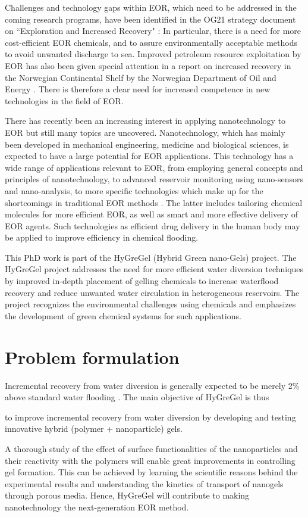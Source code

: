 Challenges and technology gaps within EOR,  which need to be addressed in the coming research programs, have been identified in the OG21 strategy document on ``Exploration and Increased Recovery" \citep{OG21}: In particular, there is a need for more cost-efficient EOR chemicals, and to assure environmentally acceptable methods to avoid unwanted discharge to sea. Improved petroleum resource exploitation by EOR has also been given special attention in a report on increased recovery in the Norwegian Continental Shelf by the Norwegian Department of Oil and Energy \citep{Am2010}. There is therefore a clear need for increased competence in new technologies in the field of EOR. 

There has recently been an increasing interest in applying nanotechnology to EOR but still many topics are uncovered. Nanotechnology,  which has mainly been developed in mechanical engineering, medicine and biological sciences, is expected to have a large potential for EOR applications. This technology has a wide range of applications relevant to EOR, from employing general concepts and principles of nanotechnology, to advanced reservoir monitoring using nano-sensors and nano-analysis, to more specific technologies which make up for the shortcomings in traditional EOR methods \citep{Fletcher2010, Ayatollahi2012, Cocuzza2011}. The latter includes tailoring chemical molecules for more efficient EOR, as well as smart and more effective delivery of EOR agents. Such technologies as efficient drug delivery in the human body may be applied to improve efficiency in chemical flooding.

This PhD work is part of the HyGreGel (Hybrid Green nano-Gels) project. The HyGreGel project addresses the need for more efficient water diversion techniques by improved in-depth placement of gelling chemicals to increase waterflood recovery and reduce unwanted water circulation in heterogeneous reservoirs. The project recognizes the environmental challenges using chemicals and emphasizes the development of green chemical systems for such applications.
\section{Problem formulation}

Incremental recovery from water diversion is generally expected to be merely 2\% above standard water flooding \citep{OG21}. The main objective of HyGreGel is thus 
\begin{tcolorbox}
to improve incremental recovery from water diversion by developing and testing innovative hybrid (polymer + nanoparticle) gels.
\end{tcolorbox}
A thorough study of the effect of surface functionalities of the nanoparticles and their reactivity with the polymers will enable great improvements in controlling gel formation. This can be achieved by learning the scientific reasons behind the experimental results and understanding the kinetics of transport of nanogels through porous media. Hence,  HyGreGel will contribute to making nanotechnology the next-generation EOR method.

